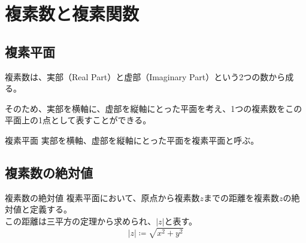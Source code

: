 \documentclass[16pt,b5paper]{book}
\begin{document}
\chapter{複素数と複素関数}

\section{複素平面}

複素数は、実部（Real Part）と虚部（Imaginary Part）という2つの数から成る。

そのため、実部を横軸に、虚部を縦軸にとった平面を考え、1つの複素数をこの平面上の1点として表すことができる。

\begin{definition}{複素平面}
  実部を横軸、虚部を縦軸にとった平面を複素平面と呼ぶ。
\end{definition}

\begin{center}
\end{center}

\section{複素数の絶対値}

\begin{definition}{複素数の絶対値}
  \newline
  複素平面において、原点から複素数$z$までの距離を複素数$z$の絶対値と定義する。\\
  この距離は三平方の定理から求められ、$|z|$と表す。
  \LARGE
  \begin{equation}
    |z| \coloneqq \sqrt{x^2 + y^2}
  \end{equation}
\end{definition}
\end{document}
